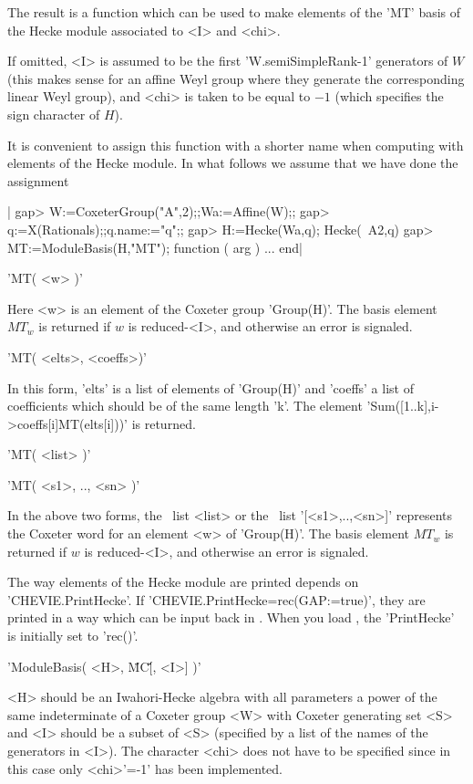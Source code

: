 The result is a function which can be used to make elements of the 'MT'
basis of the Hecke module associated to <I> and <chi>.

If  omitted,  <I>  is  assumed to  be  the  first  'W.semiSimpleRank-1'
generators of $W$ (this makes sense for an affine Weyl group where they
generate the corresponding linear Weyl group), and <chi> is taken to be
equal to $-1$ (which specifies the sign character of $H$).

It  is convenient  to assign  this function  with a  shorter name  when
computing with elements of the Hecke  module. In what follows we assume
that we have done the assignment\:\

|    gap> W:=CoxeterGroup("A",2);;Wa:=Affine(W);;
    gap> q:=X(Rationals);;q.name:="q";;
    gap> H:=Hecke(Wa,q);
    Hecke(~A2,q)
    gap> MT:=ModuleBasis(H,"MT");
    function ( arg ) ... end|

'MT( <w> )'

Here  <w> is  an element  of the  Coxeter group  'Group(H)'. The  basis
element  $MT_w$ is  returned if  $w$ is  reduced-<I>, and  otherwise an
error is signaled.


'MT( <elts>, <coeffs>)'

In this form, 'elts' is a list of elements of 'Group(H)' and 'coeffs' a
list  of coefficients  which  should be  of the  same  length 'k'.  The
element 'Sum([1..k],i->coeffs[i]\*MT(elts[i]))' is returned.

'MT( <list> )'

'MT( <s1>, .., <sn> )'

In  the above  two  forms, the  \GAP\  list <list>  or  the \GAP\  list
'[<s1>,..,<sn>]'  represents the  Coxeter word  for an  element <w>  of
'Group(H)'. The basis element $MT_w$ is returned if $w$ is reduced-<I>,
and otherwise an error is signaled.

The way elements of the Hecke module are printed depends on
'CHEVIE.PrintHecke'.   If   'CHEVIE.PrintHecke=rec(GAP:=true)',   they  are
printed  in a way which  can be input back  in \GAP. When you load \CHEVIE,
the 'PrintHecke' is initially set to 'rec()'.


'ModuleBasis( <H>, \"MC\'\" [, <I>] )'

<H> should be  an Iwahori-Hecke algebra with all parameters  a power of
the same indeterminate  of a Coxeter group <W>  with Coxeter generating
set <S> and <I>  should be a subset of <S> (specified by  a list of the
names of the  generators in <I>). The character <chi>  does not have to
be specified since in this case only <chi>'=-1' has been implemented.


